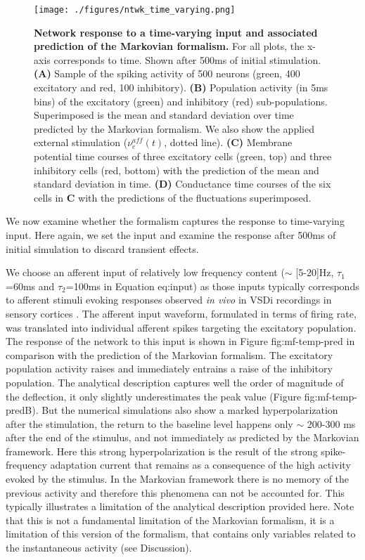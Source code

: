 \documentclass[8pt, colorlinks, a4paper]{article}
\renewcommand\ref{}
\begin{document}
\begin{figure}[tb!]
\centering
\texttt{[image: ./figures/ntwk\_time\_varying.png]}
\caption{\label{fig:mf-temp-pred}\textbf{Network response to a
    time-varying input and associated prediction of the Markovian
    formalism.} For all plots, the x-axis corresponds to time. Shown
  after 500ms of initial stimulation. \textbf{(A)} Sample of the
  spiking activity of 500 neurons (green, 400 excitatory and red, 100
  inhibitory). \textbf{(B)} Population activity (in 5ms bins) of the
  excitatory (green) and inhibitory (red)
  sub-populations. Superimposed is the mean and standard deviation
  over time predicted by the Markovian formalism. We also show the
  applied external stimulation (\(\nu_e^{aff}(t)\), dotted
  line). \textbf{(C)} Membrane potential time courses of three
  excitatory cells (green, top) and three inhibitory cells (red,
  bottom) with the prediction of the mean and standard deviation in
  time. \textbf{(D)} Conductance time courses of the six cells in
  \textbf{C} with the predictions of the fluctuations superimposed.}
\end{figure}

We now examine whether the formalism captures the response to
time-varying input. Here again, we set the input and examine the
response after 500ms of initial simulation to discard transient
effects.

We choose an afferent input of relatively low frequency content
(\(\sim\) [5-20]Hz, \( \tau_1 \)=60ms and \( \tau_2 \)=100ms in
Equation \ref{eq:input}) as those inputs typically corresponds to
afferent stimuli evoking responses observed \emph{in vivo} in VSDi
recordings in sensory cortices \cite{Reynaud2012,Destexhe2015}. The
afferent input waveform, formulated in terms of firing rate, was
translated into individual afferent spikes targeting the excitatory
population. The response of the network to this input is shown in
Figure \ref{fig:mf-temp-pred} in comparison with the prediction of the
Markovian formalism. The excitatory population activity raises and
immediately entrains a raise of the inhibitory population. The
analytical description captures well the order of magnitude of the
deflection, it only slightly underestimates the peak value (Figure
\ref{fig:mf-temp-pred}B). But the numerical simulations also show a
marked hyperpolarization after the stimulation, the return to the
baseline level happens only \(\sim\) 200-300 ms after the end of the
stimulus, and not immediately as predicted by the Markovian
framework. Here this strong hyperpolarization is the result of the
strong spike-frequency adaptation current that remains as a
consequence of the high activity evoked by the stimulus. In the
Markovian framework there is no memory of the previous activity and
therefore this phenomena can not be accounted for. This typically
illustrates a limitation of the analytical description provided
here. Note that this is not a fundamental limitation of the Markovian
formalism, it is a limitation of this version of the formalism, that
contains only variables related to the instantaneous activity (see
Discussion).
\end{document}
